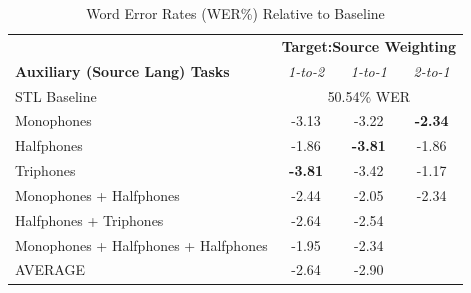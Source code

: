 \documentclass[a4paper]{article}
\begin{document}
\begin{table}[!htbp]
  \centering
  \caption{Word Error Rates (WER\%) Relative to Baseline}
  \begin{adjustbox}{width=.45\textwidth}
    \begin{tabular}{lccc}
      \toprule
      & \multicolumn{3}{c}{\textbf{Target:Source Weighting}} \\
      \textbf{Auxiliary (Source Lang) Tasks} & \textit{1-to-2} & \textit{1-to-1} & \textit{2-to-1}\\
      \midrule
      STL Baseline                          &  \multicolumn{3}{c}{50.54\% WER}  \\
      Monophones                            &  -3.13  & -3.22 & \textbf{-2.34}  \\
      Halfphones                            &  -1.86  & \textbf{-3.81} & -1.86 \\
      Triphones                             &  \textbf{-3.81} & -3.42 & -1.17  \\
      Monophones + Halfphones               &  -2.44  & -2.05 &  -2.34\\
      Halfphones + Triphones                &  -2.64  & -2.54 & \\
      Monophones + Halfphones + Halfphones  &  -1.95  & -2.34 & \\
      \midrule
      AVERAGE                               &  -2.64  & -2.90 & \\
      \bottomrule
    \end{tabular}
    \label{table:data}
  \end{adjustbox}
\end{table}
\end{document}
